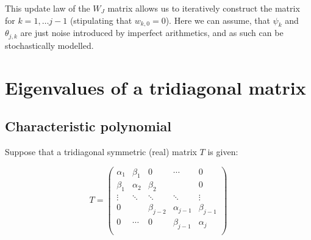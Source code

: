 \documentclass{article}
\begin{document}
	 This update law of the $W_J$ matrix allows us to iteratively construct the matrix for $k=1,\dots j-1$ (stipulating that $w_{k,0} = 0$). Here we can assume, that $\psi_k$ and $\theta_{j,k}$ are just noise introduced by imperfect arithmetics, and as such can be stochastically modelled.
	 
\section{Eigenvalues of a tridiagonal matrix}
\subsection{Characteristic polynomial}
Suppose that a tridiagonal symmetric (real) matrix $T$ is given:

$$T=\begin{pmatrix}
	\alpha_1&\beta_1&0&\cdots&0\\
	\beta_1&\alpha_2&\beta_2&&0\\
	\vdots&\ddots&\ddots&\ddots&\vdots\\
	0&&\beta_{j-2}&\alpha_{j-1}&\beta_{j-1}\\
	0&\cdots&0&\beta_{j-1}&\alpha_{j}\\
\end{pmatrix}$$
\end{document}
